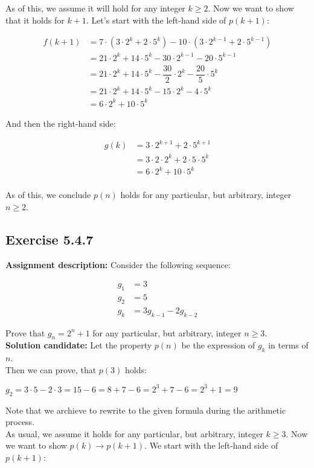 \documentclass{report}
\newcommand{\cent}[1]{\begin{center}#1\end{center}}
\newcommand{\mAlign}[1]{\begin{align*}#1\end{align*}}
\newcommand{\AssignmentDescription}{\textbf{Assignment description: }}
\newcommand{\Solution}{\textbf{Solution candidate: }}
\newcommand{\QED}{\boxed{}}
\newcommand{\Exercise}[1]{\subsection{Exercise #1}}
\newcommand{\parenthesis}[1]{\left( #1 \right)}
\begin{document}
 	As of this, we assume it will hold for any integer $k \geq 2$. Now we want to show that it holds for $k+1$. Let's start with the left-hand side of $p(k+1)$:
 	
 	\mAlign{
 		f(k+1) &=  7 \cdot \parenthesis{3 \cdot 2^k + 2 \cdot 5^k} - 10 \cdot \parenthesis{3 \cdot 2^{k-1} + 2 \cdot 5^{k-1}} \\
 		&=  21 \cdot 2^k+ 14  \cdot 5^k - 30 \cdot 2^{k-1} - 20 \cdot 5^{k-1} \\
 		&=  21 \cdot 2^k+ 14  \cdot 5^k - \dfrac{30}{2} \cdot 2^k -\dfrac{ 20 }{5} \cdot 5^k \\
 		&=  21 \cdot 2^k+ 14  \cdot 5^k - 15 \cdot 2^k -4 \cdot 5^k \\
 		&=  6 \cdot 2^k+ 10  \cdot 5^k
 	}
 
 	And then the right-hand side:
 	
 	\mAlign{
 		g(k) &= 3 \cdot 2^{k+1} + 2 \cdot 5^{k+1} \\
 		&= 3 \cdot 2 \cdot 2^k  + 2 \cdot 5 \cdot 5^k\\
 		&= 6  \cdot 2^k  + 10 \cdot 5^k\\
 	}
 
 	As of this, we conclude $p(n)$ holds for any particular, but arbitrary, integer $n \geq 2$.
 	\QED
 	
 	\Exercise{5.4.7}
 	
 	\AssignmentDescription
 	Consider the following sequence:
 	
 	\mAlign{
 		g_1 &= 3 \\
 		g_2 &= 5 \\
 		g_k &= 3g_{k-1} - 2 g_{k-2}
 	}
 	
 	Prove that $g_n = 2^n + 1$ for any particular, but arbitrary, integer $n \geq 3$.\\
 	
 	\Solution
 	Let the property $p(n)$ be the expression of $g_k$ in terms of $n$.\\
 	
 	Then we can prove, that $p(3)$ holds:
 	
 	\cent{$g_2 = 3 \cdot 5 - 2 \cdot 3 = 15-6 = 8+7-6 = 2^3 +7-6 = 2^3 +1 = 9 $}
 	
 	Note that we archieve to rewrite to the given formula during the arithmetic process.\\
 	
 	As usual, we assume it holds for any particular, but arbitrary, integer $k \geq 3$. Now we want to show $p(k) \to p(k+1)$. We start with the left-hand side of $p(k+1)$:
 	
\end{document}
